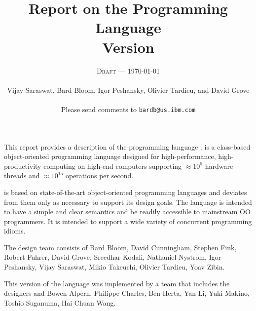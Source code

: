 
\thispagestyle{empty}


\title{Report on the Programming Language \Xten \\
\large Version \integerversion}
\author{\textsc{Draft} --- \today \\
\\
Vijay Saraswat, Bard Bloom, Igor Peshansky, Olivier Tardieu, and David Grove\\
\\
Please send comments to 
\texttt{bardb@us.ibm.com}}

\maketitle

\newcommand\authorsc[1]{#1}

This report provides a description of the programming
language \Xten. \Xten{} is a class-based object-oriented
programming language designed for high-performance, high-productivity
computing on high-end computers supporting $\approx 10^5$ hardware threads
and $\approx 10^{15}$ operations per second. 

\Xten{} is based on state-of-the-art object-oriented programming
languages and deviates from them only as necessary to support its
design goals. The language is intended to have a simple and clear
semantics and be readily accessible to mainstream OO programmers. It
is intended to support a wide variety of concurrent programming
idioms.


The \Xten{} design team consists of
\authorsc{Bard Bloom}, 
\authorsc{David Cunningham},
\authorsc{Stephen Fink},
\authorsc{Robert Fuhrer},
\authorsc{David Grove},
\authorsc{Sreedhar Kodali}, 
\authorsc{Nathaniel Nystrom},
\authorsc{Igor Peshansky}, 
\authorsc{Vijay Saraswat},
\authorsc{Mikio Takeuchi},
\authorsc{Olivier Tardieu},
\authorsc{Yoav Zibin}.

This version of the language was implemented by a team that includes
the designers and 
\authorsc{Bowen Alpern}, 
\authorsc{Philippe Charles}, 
\authorsc{Ben Herta}, 
\authorsc{Yan Li}, 
\authorsc{Yuki Makino}, 
\authorsc{Toshio Suganuma}, 
\authorsc{Hai Chuan Wang}. 


